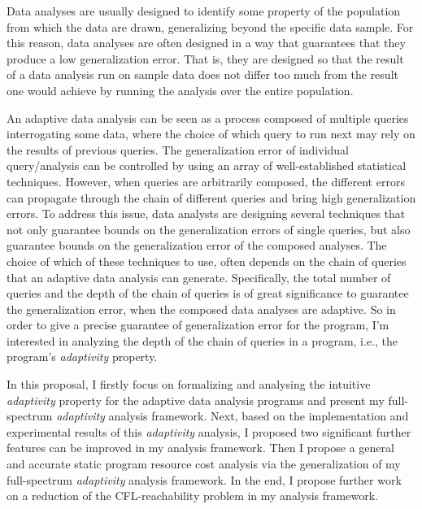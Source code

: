 Data analyses are usually designed to identify some property of the population from which the data are drawn, generalizing beyond the specific data sample. For this reason, data analyses are often designed in a way that guarantees that they produce a low generalization error.
 That is, they are designed so that the result of a data analysis run on sample data does not differ too much from the result one would achieve by running the analysis over the entire population. 
 
 An adaptive data analysis can be seen as a process composed of multiple queries interrogating some data, where the choice of which query to run next may rely on the results of previous queries. 
 The generalization error of individual query/analysis can be controlled by using an array of well-established statistical techniques.
 However, when queries are arbitrarily composed, the different errors can propagate through the chain of different queries and bring high generalization errors. 
 To address this issue, data analysts are designing several techniques that not only guarantee bounds on the generalization errors of single queries, but also guarantee bounds on the generalization error of the composed analyses. 
 The choice of which of these techniques to use, 
 often depends on the chain of queries that an adaptive data analysis can generate.
 Specifically, the total number of queries and the depth of the chain of queries is of great significance 
 to guarantee the generalization error, 
 when the composed data analyses are adaptive. 
 So in order to give a precise guarantee of generalization error
 for the program,
 I'm interested in analyzing the depth of the chain of queries in a program, i.e., the program's \emph{adaptivity} property.

 In this proposal, I firstly focus on formalizing and analysing the intuitive \emph{adaptivity} property for the adaptive data analysis programs 
 and present 
 my full-spectrum \emph{adaptivity} analysis framework.
 Next, based on the implementation and experimental results of this \emph{adaptivity} analysis, 
 I proposed two significant 
 further features can be improved in my analysis framework.
Then I propose 
a general and accurate static program resource cost analysis via
the generalization of my full-spectrum \emph{adaptivity} analysis framework.
In the end, I propose further work on a reduction of the CFL-reachability problem in my analysis framework.
